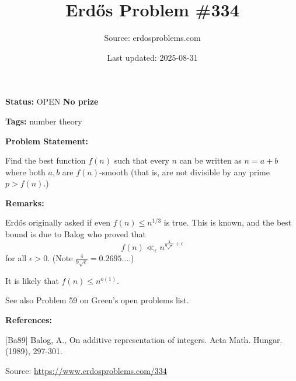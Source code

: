 \documentclass{article}
\title{Erd\H{o}s Problem \#334}
\date{Last updated: 2025-08-31}
\author{Source: erdosproblems.com}
\begin{document}
\maketitle

\noindent\textbf{Status:} OPEN \quad \textbf{No prize}

\noindent\textbf{Tags:} number theory

\medskip
\noindent\textbf{Problem Statement:}

Find the best function $f(n)$ such that every $n$ can be written as $n=a+b$ where both $a,b$ are $f(n)$-smooth (that is, are not divisible by any prime $p>f(n)$.)

\bigskip
\noindent\textbf{Remarks:}

Erd\H{o}s originally asked if even $f(n)\leq n^{1/3}$ is true. This is known, and the best bound is due to Balog \cite{Ba89} who proved that\[f(n) \ll_\epsilon n^{\frac{4}{9\sqrt{e}}+\epsilon}\]for all $\epsilon>0$. (Note $\frac{4}{9\sqrt{e}}=0.2695\ldots$.)

It is likely that $f(n)\leq n^{o(1)}$.

See also Problem 59 on Green's open problems list.

\bigskip
\noindent\textbf{References:}

[Ba89] Balog, A., On additive representation of integers. Acta Math. Hungar. (1989), 297-301.

\bigskip
\noindent\small{Source: \url{https://www.erdosproblems.com/334}}
\end{document}
